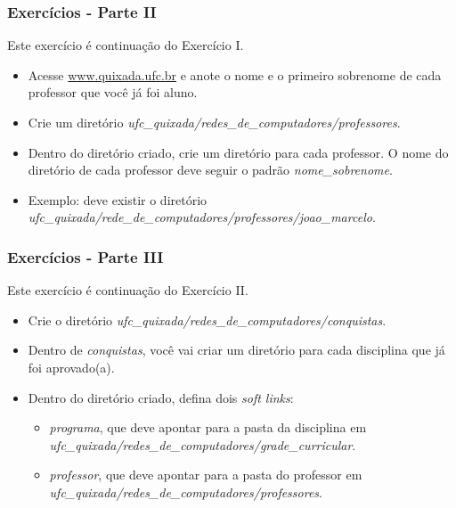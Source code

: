 \documentclass{beamer}
\begin{document}
   \begin{frame}
      \frametitle{Exercícios - Parte II}
      Este exercício é continuação do Exercício I.
      \begin{itemize}
         \item Acesse \url{www.quixada.ufc.br} e anote o nome e o primeiro sobrenome de cada professor que você já foi aluno.
         \item Crie um diretório \textit{ufc\_quixada/redes\_de\_computadores/professores}.
         \item Dentro do diretório criado, crie um diretório para cada professor. O nome do diretório de cada professor deve seguir o padrão \textit{nome\_sobrenome}. 
         \item Exemplo: deve existir o diretório \textit{ufc\_quixada/rede\_de\_computadores/professores/joao\_marcelo}.
      \end{itemize}
   \end{frame}

   \begin{frame}
      \frametitle{Exercícios - Parte III}
      Este exercício é continuação do Exercício II.
      \begin{itemize}
         \item Crie o diretório \textit{ufc\_quixada/redes\_de\_computadores/conquistas}.
	 \item Dentro de \textit{conquistas}, você vai criar um diretório para cada disciplina que já foi aprovado(a).
         \item Dentro do diretório criado, defina dois \textit{soft links}:
	 \begin{itemize}
	    \item \textit{programa}, que deve apontar para a pasta da disciplina em \textit{ufc\_quixada/redes\_de\_computadores/grade\_curricular}.
	    \item \textit{professor}, que deve apontar para a pasta do professor em \textit{ufc\_quixada/redes\_de\_computadores/professores}.
	 \end{itemize}
      \end{itemize}
   \end{frame}
\end{document}
